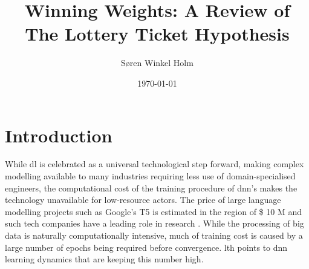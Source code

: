 \documentclass[12pt,fleqn,twocolumn]{article}
\title{Winning Weights: A Review of The Lottery Ticket Hypothesis}
\author{Søren Winkel Holm}
\date{\today}
\begin{document}
\setlength{\headheight}{15pt}
\addtolength{\topmargin}{-2.5pt}

\maketitle
\thispagestyle{fancy}

\section*{Introduction}%
\label{sec:Introduction}
While \acrfull{dl} is celebrated as a universal technological step forward, making complex modelling available to many industries requiring less use of domain-specialised engineers, the computational cost of the training procedure of \acrfull{dnn}'s makes the technology unavailable for low-resource actors.
The price of large language modelling projects such as Google's T5 is estimated in the region of \$ 10 M \cite{Sharir2020TheCO} and such tech companies have a leading role in research \cite{ivanov2020icml, ivanov2020neurips}.
While the processing of big data is naturally computationally intensive, much of training cost is caused by a large number of epochs being required before convergence.
\acrfull{lth} points to \acrshort{dnn} learning dynamics that are keeping this number high.
\end{document}
